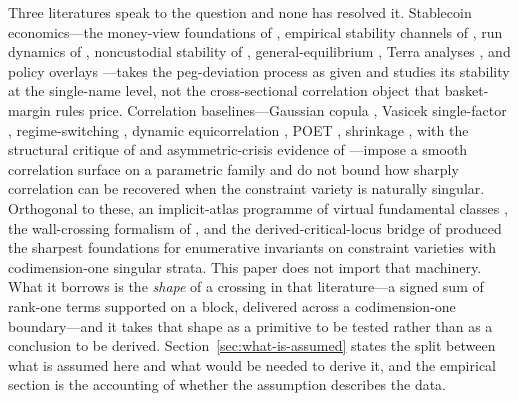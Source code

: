 Three literatures speak to the question and none has resolved it. Stablecoin economics---the money-view foundations of \citet{GortonEtal2022, CatalinKirk2022}, empirical stability channels of \citet{LyonsViswanath2023, dAvernasEtal2024}, run dynamics of \citet{MaZengZhang2023}, noncustodial stability of \citet{Klages2022, KlagesMundtMinca2020}, general-equilibrium \citep{RoutledgeZetlin2022}, Terra analyses \citep{Uhlig2022, LiuLiSprenger2023}, and policy overlays \citep{FSB2023Stablecoin, BIS2023Stablecoin, PWG2021Stablecoin}---takes the peg-deviation process as given and studies its stability at the single-name level, not the cross-sectional correlation object that basket-margin rules price. Correlation baselines---Gaussian copula \citep{Li2000}, Vasicek single-factor \citep{Vasicek2002}, regime-switching \citep{Pelletier2006}, dynamic equicorrelation \citep{EngleKelly2012}, POET \citep{FanLiaoMincheva2013}, shrinkage \citep{LedoitWolf2004}, with the structural critique of \citet{CovalJurekStafford2009} and asymmetric-crisis evidence of \citet{AngChen2002}---impose a smooth correlation surface on a parametric family and do not bound how sharply correlation can be recovered when the constraint variety is naturally singular. Orthogonal to these, an implicit-atlas programme of virtual fundamental classes \citep{FukayaOno1999, LiTian1998, BehrendFantechi1997, Pardon2016, Pardon2019}, the wall-crossing formalism of \citet{KontsevichSoibelman2008, Bridgeland2007}, and the derived-critical-locus bridge of \citet{Joyce2015} produced the sharpest foundations for enumerative invariants on constraint varieties with codimension-one singular strata. This paper does not import that machinery. What it borrows is the \emph{shape} of a crossing in that literature---a signed sum of rank-one terms supported on a block, delivered across a codimension-one boundary---and it takes that shape as a primitive to be tested rather than as a conclusion to be derived. Section~\ref{sec:what-is-assumed} states the split between what is assumed here and what would be needed to derive it, and the empirical section is the accounting of whether the assumption describes the data.

